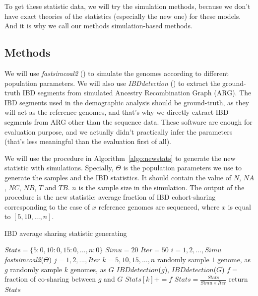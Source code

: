 \documentclass{bioinfo}
\begin{document}
To get these statistic data, we will try the simulation methods, because we don't have exact theories of the statistics (especially the new one) for these models. And it is why we call our methods simulation-based methods.





\begin{methods}
\section{Methods}

We will use \textit{fastsimcoal2} (\cite{Excoffier2013}) to simulate the genomes according to different population parameters. We will also use \textit{IBDdetection} (\cite{Yang2015}) to extract the ground-truth IBD segments from simulated Ancestry Recombination Graph (ARG). The IBD segments used in the demographic analysis should be ground-truth, as they will act as the reference genomes, and that's why we directly extract IBD segments from ARG other than the sequence data. These software are enough for evaluation purpose, and we actually didn't practically infer the parameters (that's less meaningful than the evaluation first of all).

We will use the procedure in Algorithm~\ref{algo:newstats} to generate the new statistic with simulations. Specially, $\Theta$ is the population parameters we use to generate the samples and the IBD statistics. It should contain the value of $N$, $NA$, $NC$, $NB$, $T$ and $TB$. $n$ is the sample size in the simulation. The output of the procedure is the new statistic: average fraction of IBD cohort-sharing corresponding to the case of $x$ reference genomes are sequenced, where $x$ is equal to $[5,10,...,n]$.

\begin{algorithm}
\caption{IBD average sharing statistic generating}
\label{algo:newstats}
\vspace{-0.32cm}  %
\begin{codebox}
\li	$Stats=\{5:0, 10:0, 15:0, ... , n:0\}$
\li	$Simu=20$
\li	$Iter=50$
\li \For $i=1,2,...,Simu$
\li	\Do	\textit{fastsimcoal2}($\Theta$)
\li		\For $j=1,2,...,Iter$
\li		\Do \For $k=5,10,15,...,n$
\li			\Do randomly sample $1$ genome, as $g$
\li				randomly sample $k$ genomes, as $G$
\li				$IBDdetection$($g$), $IBDdetection$($G$)
\li				$f=$ fraction of co-sharing between $g$ and $G$
\li				$Stats[k]+=f$
			\End
		\End
	\End
\li	$Stats=\frac{Stats}{Simu \times Iter}$
\li	return $Stats$
\end{codebox}
\vspace{-0.35cm}  %
\end{algorithm}


\end{methods}
\end{document}

